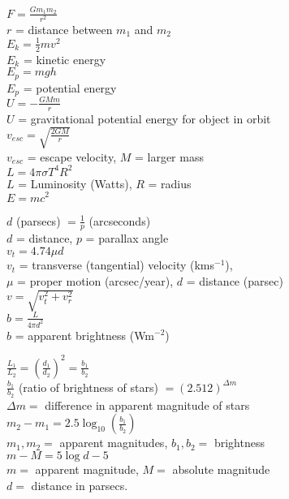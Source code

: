 \documentclass[10pt,landscape]{article}
\begin{document}
\begin{multicols}{3}
$F = \frac{Gm_1m_2}{r^2}$\\
$r$ = distance between $m_1$ and $m_2$\\

$E_k = \frac{1}{2}mv^2$\\
$E_k$ = kinetic energy\\

$E_p = mgh$\\
$E_p$ = potential energy\\

$U = -\frac{GMm}{r}$\\
$U$ = gravitational potential energy for object in orbit\\

$v_{esc} = \sqrt{\frac{2GM}{r}}$\\
$v_{esc}$ = escape velocity, $M$ = larger mass\\

$L=4\pi\sigma T^4R^2$\\
$L$ = Luminosity (Watts), $R$ = radius\\

$E = mc^2$

$d$ (parsecs) $= \frac{1}{p}$ (arcseconds)\\
$d$ = distance, $p$ = parallax angle\\

$v_t = 4.74 \mu d$\\
$v_t$ = transverse (tangential) velocity (kms$^{-1}$),\\ $\mu$ = proper motion (arcsec/year), $d$ = distance (parsec)\\

$v = \sqrt{v_t^2+ v_r^2}$\\

$b = \frac{L}{4\pi d^2}$\\
$b$ = apparent brightness (Wm$^{-2}$)

$\frac{L_1}{L_2} = \left( \frac{d_1}{d_2}\right)^2 = \frac{b_1}{b_2}$\\

$\frac{b_1}{b_2}$ (ratio of brightness of stars) $ = (2.512)^{\Delta m}$\\
$\Delta m = $ difference in apparent magnitude of stars\\

$m_2 - m_1 = 2.5 \log_{10} \left(\frac{b_1}{b_2}\right)$\\
$m_1, m_2 = $ apparent magnitudes, $b_1, b_2 = $ brightness\\

$m - M = 5 \log d - 5$\\
$m = $ apparent magnitude, $M = $ absolute magnitude\\
$d = $ distance in parsecs.\\


\end{multicols}
\end{document}
